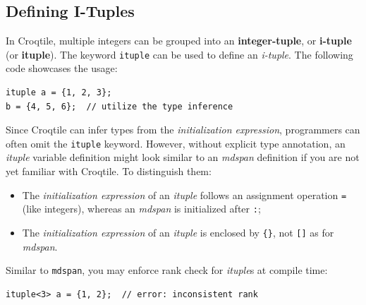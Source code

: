 \subsection*{Defining I-Tuples}

In Croqtile, multiple integers can be grouped into an \textbf{integer-tuple}, or \textbf{i-tuple} (or \textbf{ituple}). The keyword \texttt{ituple} can be used to define an \emph{i-tuple}. The following code showcases the usage:

\begin{lstlisting}[language=croqtile,caption={An i-tuple literal}]
ituple a = {1, 2, 3};
b = {4, 5, 6};  // utilize the type inference
\end{lstlisting}

Since Croqtile can infer types from the \emph{initialization expression}, programmers can often omit the \texttt{ituple} keyword. However, without explicit type annotation, an \emph{ituple} variable definition might look similar to an \emph{mdspan} definition if you are not yet familiar with Croqtile. To distinguish them:

\begin{itemize}[leftmargin=1.6em]
\item The \emph{initialization expression} of an \emph{ituple} follows an assignment operation \texttt{=} (like integers), whereas an \emph{mdspan} is initialized after \texttt{:};
\item The \emph{initialization expression} of an \emph{ituple} is enclosed by \texttt{\{\}}, not \texttt{[]} as for \emph{mdspan}.
\end{itemize}

Similar to \texttt{mdspan}, you may enforce rank check for \emph{ituple}s at compile time:

\begin{lstlisting}[language=croqtile,caption={An inconsistent rank}]
ituple<3> a = {1, 2};  // error: inconsistent rank
\end{lstlisting}
